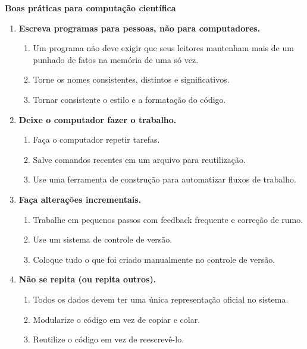 \begin{tcolorbox}

\textbf{Boas práticas para computação científica}

\begin{enumerate}
\item \textbf{Escreva programas para pessoas, não para computadores.}
    \begin{enumerate}
        \item Um programa não deve exigir que seus leitores mantenham mais de um punhado de fatos na memória de uma só vez.
        \item Torne os nomes consistentes, distintos e significativos.
        \item Tornar consistente o estilo e a formatação do código.
    \end{enumerate}

\item \textbf{Deixe o computador fazer o trabalho.}
    \begin{enumerate}
        \item Faça o computador repetir tarefas.
        \item Salve comandos recentes em um arquivo para reutilização.
        \item Use uma ferramenta de construção para automatizar fluxos de trabalho.
    \end{enumerate}

\item \textbf{Faça alterações incrementais.}
    \begin{enumerate}
        \item Trabalhe em pequenos passos com feedback frequente e correção de rumo.
        \item Use um sistema de controle de versão.
        \item Coloque tudo o que foi criado manualmente no controle de versão.
    \end{enumerate}

\item \textbf{Não se repita (ou repita outros).}
    \begin{enumerate}
        \item Todos os dados devem ter uma única representação oficial no sistema.
        \item Modularize o código em vez de copiar e colar.
        \item Reutilize o código em vez de reescrevê-lo.
    \end{enumerate}


\end{enumerate}
\end{tcolorbox}
